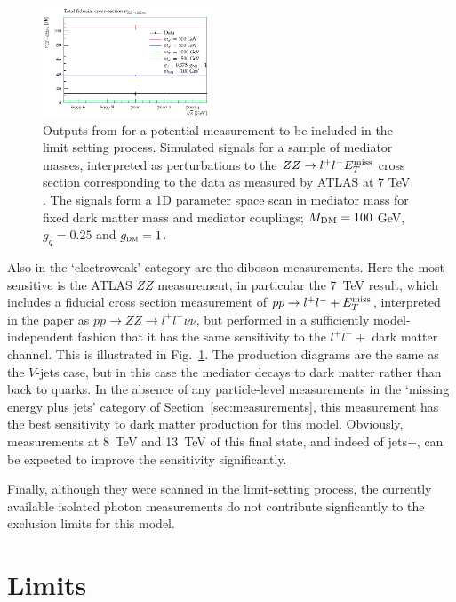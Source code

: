 \documentclass[floatfix]{article}
\begin{document}
\begin{figure}
\centering
      \includegraphics[width=0.45\textwidth]{images/atlaszz/fullrange/ATLASZZ.pdf}
\caption{Outputs from \rivet for a potential measurement to be included in the limit setting process. Simulated signals for a 
sample of mediator masses, interpreted as perturbations to the $ZZ\rightarrow l^+l^- E_T^{\rm miss}$ cross section 
corresponding to the data as measured by ATLAS at 7 TeV~\cite{Aad:2012awa} \label{fig:ATLASzz}. The signals form a 1D parameter space scan in 
mediator mass \MZP for fixed dark matter mass and mediator couplings; $M_{\rm DM}=100$ GeV, $g_{q}=0.25$ and $g_{\textsc{dm}} = 1$.}
\label{fig:ATLASzz}
\end{figure}

Also in the `electroweak' category are the diboson measurements. Here the most sensitive is the ATLAS $ZZ$ measurement, in particular the 7~TeV result, which includes
a fiducial cross section measurement of $pp \rightarrow l^+l^- + E_T^{\rm miss}$, interpreted in the paper as $pp \rightarrow ZZ \rightarrow l^+l^- \nu \bar{\nu}$, but performed in a 
sufficiently model-independent fashion that it has the same sensitivity to the $l^+l^- +$ dark matter channel. This is illustrated in Fig.~\ref{fig:ATLASzz}.
The production diagrams are the same as the $V$-jets case, but in this case the 
mediator decays to dark matter rather than back to quarks. 
In the absence of any particle-level measurements in the `missing energy plus jets' category of 
Section~\ref{sec:measurements}, this measurement has the best sensitivity to dark matter production for this model. Obviously, measurements at 8~TeV and 13~TeV of this 
final state, and indeed of jets+\MET, can be expected to improve the sensitivity significantly.

Finally, although they were scanned in the limit-setting process, the currently available isolated photon measurements do not contribute signficantly to the exclusion
limits for this model.

\section{Limits}\label{sec:limits}
\end{document}
